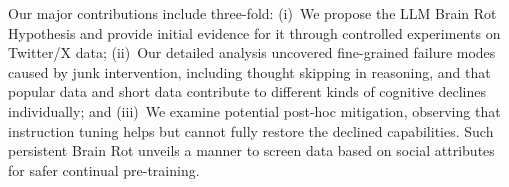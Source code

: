 Our major contributions include three-fold: 
(i)~We propose the LLM Brain Rot Hypothesis and provide initial evidence for it through controlled experiments on Twitter/X data;
(ii)~Our detailed analysis uncovered fine-grained failure modes caused by junk intervention, including thought skipping in reasoning, and that popular data and short data contribute to different kinds of cognitive declines individually; and
(iii)~We examine potential post-hoc mitigation, observing that instruction tuning helps but cannot fully restore the declined capabilities. 
Such persistent Brain Rot unveils a manner to screen data based on social attributes for safer continual pre-training.
